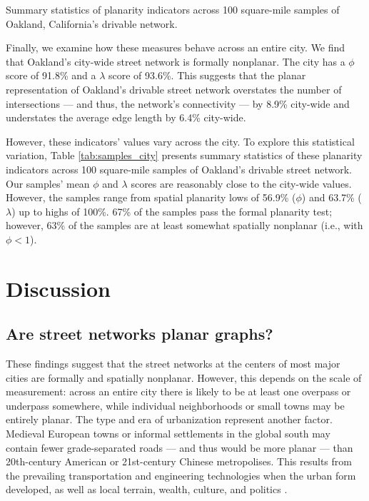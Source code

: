 \documentclass[Afour,sageh,times]{sagej}
\begin{document}
\begin{table}[htbp]
	\centering
	\caption{Summary statistics of planarity indicators across 100 square-mile samples of Oakland, California's drivable network.}
	\label{tab:samples_city}
	
\end{table}

Finally, we examine how these measures behave across an entire city. We find that Oakland's city-wide street network is formally nonplanar. The city has a $\phi$ score of 91.8\% and a $\lambda$ score of 93.6\%. This suggests that the planar representation of Oakland's drivable street network overstates the number of intersections --- and thus, the network's connectivity --- by 8.9\% city-wide and understates the average edge length by 6.4\% city-wide.

However, these indicators' values vary across the city. To explore this statistical variation, Table \ref{tab:samples_city} presents summary statistics of these planarity indicators across 100 square-mile samples of Oakland's drivable street network. Our samples' mean $\phi$ and $\lambda$ scores are reasonably close to the city-wide values. However, the samples range from spatial planarity lows of 56.9\% ($\phi$) and 63.7\% ($\lambda$) up to highs of 100\%. 67\% of the samples pass the formal planarity test; however, 63\% of the samples are at least somewhat spatially nonplanar (i.e., with $\phi < 1$).



\section{Discussion}

\subsection{Are street networks planar graphs?}

These findings suggest that the street networks at the centers of most major cities are formally and spatially nonplanar. However, this depends on the scale of measurement: across an entire city there is likely to be at least one overpass or underpass somewhere, while individual neighborhoods or small towns may be entirely planar. The type and era of urbanization represent another factor. Medieval European towns or informal settlements in the global south may contain fewer grade-separated roads --- and thus would be more planar --- than 20th-century American or 21st-century Chinese metropolises. This results from the prevailing transportation and engineering technologies when the urban form developed, as well as local terrain, wealth, culture, and politics \citep{southworth_street_1995}.
\end{document}
